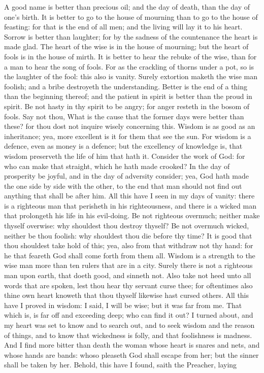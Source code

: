 A good name is better than precious oil; and the day of death, than the day of one’s birth. It is better to go to the house of mourning than to go to the house of feasting: for that is the end of all men; and the living will lay it to his heart. Sorrow is better than laughter; for by the sadness of the countenance the heart is made glad. The heart of the wise is in the house of mourning; but the heart of fools is in the house of mirth.  It is better to hear the rebuke of the wise, than for a man to hear the song of fools. For as the crackling of thorns under a pot, so is the laughter of the fool: this also is vanity. Surely extortion maketh the wise man foolish; and a bribe destroyeth the understanding.  Better is the end of a thing than the beginning thereof; and the patient in spirit is better than the proud in spirit. Be not hasty in thy spirit to be angry; for anger resteth in the bosom of fools. Say not thou, What is the cause that the former days were better than these? for thou dost not inquire wisely concerning this.  Wisdom is as good as an inheritance; yea, more excellent is it for them that see the sun. For wisdom is a defence, even as money is a defence; but the excellency of knowledge is, that wisdom preserveth the life of him that hath it. Consider the work of God: for who can make that straight, which he hath made crooked? In the day of prosperity be joyful, and in the day of adversity consider; yea, God hath made the one side by side with the other, to the end that man should not find out anything that shall be after him.  All this have I seen in my days of vanity: there is a righteous man that perisheth in his righteousness, and there is a wicked man that prolongeth his life in his evil-doing. Be not righteous overmuch; neither make thyself overwise: why shouldest thou destroy thyself? Be not overmuch wicked, neither be thou foolish: why shouldest thou die before thy time? It is good that thou shouldest take hold of this; yea, also from that withdraw not thy hand: for he that feareth God shall come forth from them all.  Wisdom is a strength to the wise man more than ten rulers that are in a city. Surely there is not a righteous man upon earth, that doeth good, and sinneth not. Also take not heed unto all words that are spoken, lest thou hear thy servant curse thee; for oftentimes also thine own heart knoweth that thou thyself likewise hast cursed others.  All this have I proved in wisdom: I said, I will be wise; but it was far from me. That which is, is far off and exceeding deep; who can find it out? I turned about, and my heart was set to know and to search out, and to seek wisdom and the reason of things, and to know that wickedness is folly, and that foolishness is madness. And I find more bitter than death the woman whose heart is snares and nets, and whose hands are bands: whoso pleaseth God shall escape from her; but the sinner shall be taken by her. Behold, this have I found, saith the Preacher, laying 